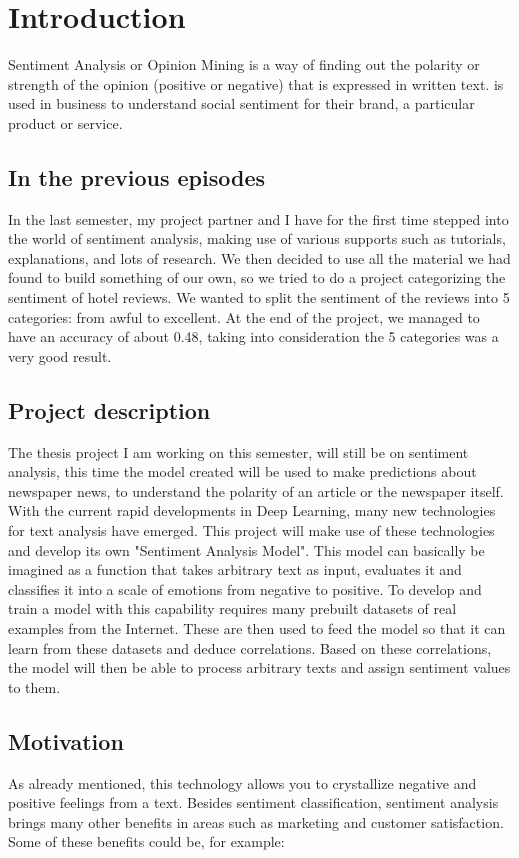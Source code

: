 \section[Introduction]{Introduction}
Sentiment Analysis or Opinion Mining is a way of finding out the polarity or strength of the opinion (positive or negative) that is expressed in written text.
is used in business to understand social sentiment for their brand, a particular product or service.

\subsection[In the previous episodes]{In the previous episodes}
In the last semester, my project partner and I have for the first time stepped into the world of sentiment analysis, making use of various supports such as tutorials, explanations, and lots of research.
We then decided to use all the material we had found to build something of our own, so we tried to do a project categorizing the sentiment of hotel reviews.
We wanted to split the sentiment of the reviews into 5 categories: from awful to excellent.
At the end of the project, we managed to have an accuracy of about 0.48, taking into consideration the 5 categories was a very good result.


\subsection[Project description]{Project description}
\label{main}
The thesis project I am working on this semester, will still be on sentiment analysis, this time the model created will be used to make predictions about newspaper news, to understand the polarity of an article or the newspaper itself.
With the current rapid developments in Deep Learning, many new technologies for text analysis have emerged.
This project will make use of these technologies and develop its own "Sentiment Analysis Model".
This model can basically be imagined as a function that takes arbitrary text as input, evaluates it and classifies it into a scale of emotions from negative to positive.
To develop and train a model with this capability requires many prebuilt datasets of real examples from the Internet. These are then used to feed the model so that it can learn from these datasets and deduce correlations. Based on these correlations, the model will then be able to process arbitrary texts and assign sentiment values to them.


\subsection{Motivation}
As already mentioned, this technology allows you to crystallize negative and positive feelings from a text. Besides sentiment classification, sentiment analysis brings many other benefits in areas such as marketing and customer satisfaction. Some of these benefits could be, for example:

